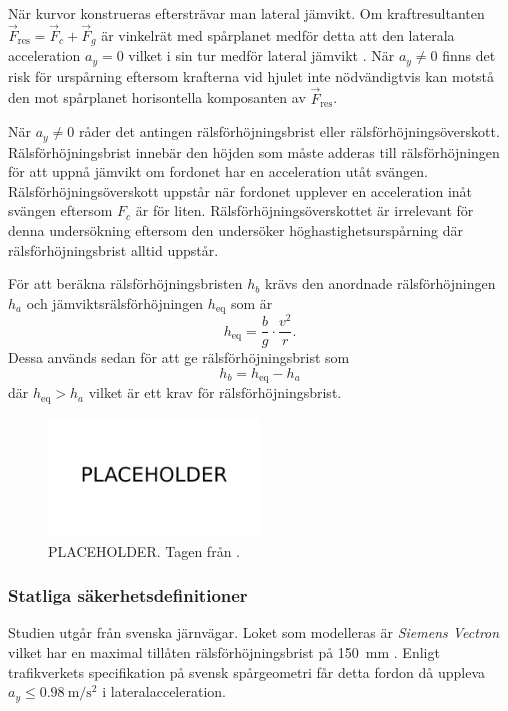 När kurvor konstrueras eftersträvar man lateral jämvikt. Om kraftresultanten $\vec F_\mathrm{res} = \vec F_c + \vec F_g$ är vinkelrät med spårplanet medför detta att den laterala acceleration $a_y=0$ vilket i sin tur medför lateral jämvikt \parencite{carlos}. När $a_y\neq0$ finns det risk för urspårning eftersom krafterna vid hjulet inte nödvändigtvis kan motstå den mot spårplanet horisontella komposanten av $\vec F_\mathrm{res}$.

När $a_y\neq 0$ råder det antingen rälsförhöjningsbrist eller rälsförhöjningsöverskott. Rälsförhöjningsbrist innebär den höjden som måste adderas till rälsförhöjningen för att uppnå jämvikt om fordonet har en acceleration utåt svängen. Rälsförhöjningsöverskott uppstår när fordonet upplever en acceleration inåt svängen eftersom $F_c$ är för liten. Rälsförhöjningsöverskottet är irrelevant för denna undersökning eftersom den undersöker höghastighetsurspårning där rälsförhöjningsbrist alltid uppstår.

För att beräkna rälsförhöjningsbristen $h_b$ krävs den anordnade rälsförhöjningen $h_a$ och jämviktsrälsförhöjningen $h_\mathrm{eq}$ som är \parencite{carlos}
\begin{equation}
    h_\mathrm{eq} =\frac{b}{g}\cdot \frac{v^2}{r}.
\end{equation}
Dessa används sedan för att ge rälsförhöjningsbrist som
\begin{equation}
    h_b=h_\mathrm{eq} - h_a
\end{equation}
där $h_\mathrm{eq} > h_a$ vilket är ett krav för rälsförhöjningsbrist.

\begin{figure}[h]
    \centering
    \includegraphics[width=0.5\textwidth]{fig/placeholder.png}
    \caption{PLACEHOLDER. Tagen från \textcite{carlos}.}
    \label{fig:tågkrafter_doserad}
\end{figure}

\subsubsection{Statliga säkerhetsdefinitioner}
Studien utgår från svenska järnvägar. Loket som modelleras är \textit{Siemens Vectron} vilket har en maximal tillåten rälsförhöjningsbrist på \SI{150}{\milli\m} \parencite{}. Enligt trafikverkets specifikation på svensk spårgeometri \parencite{} får detta fordon då uppleva $a_y\leq \SI{0.98}{\m\per\s\squared}$ i lateralacceleration.

